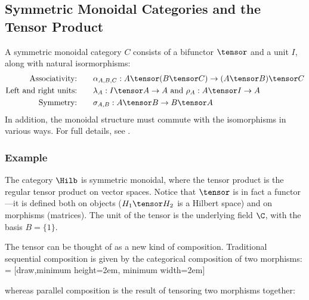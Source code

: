 \subsection{Symmetric Monoidal Categories and the Tensor Product}

\begin{definition}
A symmetric monoidal category $C$ consists of a bifunctor $\tensor$
and a unit $I$, along with natural isormorphisms:
\begin{align*}
    \text{Associativity:}&\qquad 
    \alpha_{A,B,C} : A \tensor (B \tensor C) \rightarrow (A \tensor B) \tensor C \\
    \text{Left and right units:}&\qquad 
    \lambda_A : I \tensor A \rightarrow A \text{ and } \rho_A : A \tensor I \rightarrow A \\
    \text{Symmetry:}&\qquad 
    \sigma_{A,B} : A \tensor B \rightarrow B \tensor A \\
\end{align*}
In addition, the monoidal structure must commute with the isomorphisms in 
various ways. For full details, see \cite{bierman1995categorical}.
\end{definition}

\subsubsection*{Example}
The category $\Hilb$ is symmetric monoidal, where the tensor product
is the regular tensor product on vector spaces. Notice that $\tensor$ is
in fact a functor---it is defined both on objects ($H_1 \tensor H_2$ is a Hilbert space)
and on morphisms (matrices).
The unit of the tensor is the underlying field $\C$, with the basis $B = \{ 1 \}$.

The tensor can be thought of as a new kind of composition. Traditional
sequential composition is given by the categorical composition of two morphisms:
 = [draw,minimum height=2em, minimum width=2em]
\begin{center}  \end{center}
whereas parallel composition is the result of tensoring two morphisms together:
\begin{center}  \end{center}

